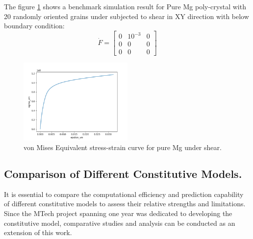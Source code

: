 The figure \ref{Benchmark_simulation} shows a benchmark simulation result for Pure Mg poly-crystal with 20 randomly oriented grains under subjected to shear in XY direction with below boundary condition:
\begin{equation}
    \dot{F} = \begin{bmatrix}  0 & 10^{-3} & 0 \\ 0 & 0 & 0 \\  0 & 0 & 0 \end{bmatrix}
\end{equation}

\begin{figure}[H]
    \centering
    \includegraphics[width=0.5\textwidth]{images/plot.png}
    \caption{von Mises Equivalent stress-strain curve for pure Mg under shear.}
    \label{Benchmark_simulation}
\end{figure}




\subsection{Comparison of Different Constitutive Models.}
It is essential to compare the computational efficiency and prediction capability of different constitutive models to assess their relative strengths and limitations. Since the MTech project spanning one year was dedicated to developing the constitutive model, comparative studies and analysis can be conducted as an extension of this work.

